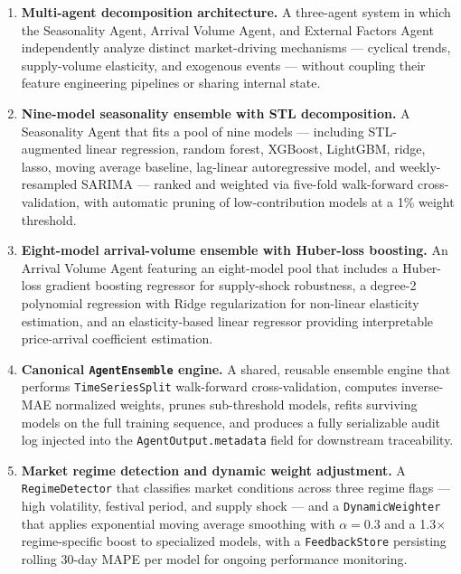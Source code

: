 \documentclass[12pt,a4paper]{report}
\begin{document}
\begin{enumerate}

    \item \textbf{Multi-agent decomposition architecture.} A three-agent system in which the Seasonality Agent, Arrival Volume Agent, and External Factors Agent independently analyze distinct market-driving mechanisms — cyclical trends, supply-volume elasticity, and exogenous events — without coupling their feature engineering pipelines or sharing internal state.

    \item \textbf{Nine-model seasonality ensemble with STL decomposition.} A Seasonality Agent that fits a pool of nine models — including STL-augmented linear regression, random forest, XGBoost, LightGBM, ridge, lasso, moving average baseline, lag-linear autoregressive model, and weekly-resampled SARIMA — ranked and weighted via five-fold walk-forward cross-validation, with automatic pruning of low-contribution models at a 1\% weight threshold.

    \item \textbf{Eight-model arrival-volume ensemble with Huber-loss boosting.} An Arrival Volume Agent featuring an eight-model pool that includes a Huber-loss gradient boosting regressor for supply-shock robustness, a degree-2 polynomial regression with Ridge regularization for non-linear elasticity estimation, and an elasticity-based linear regressor providing interpretable price-arrival coefficient estimation.

    \item \textbf{Canonical \texttt{AgentEnsemble} engine.} A shared, reusable ensemble engine that performs \texttt{TimeSeriesSplit} walk-forward cross-validation, computes inverse-MAE normalized weights, prunes sub-threshold models, refits surviving models on the full training sequence, and produces a fully serializable audit log injected into the \texttt{AgentOutput.metadata} field for downstream traceability.

    \item \textbf{Market regime detection and dynamic weight adjustment.} A \texttt{RegimeDetector} that classifies market conditions across three regime flags — high volatility, festival period, and supply shock — and a \texttt{DynamicWeighter} that applies exponential moving average smoothing with $\alpha=0.3$ and a 1.3$\times$ regime-specific boost to specialized models, with a \texttt{FeedbackStore} persisting rolling 30-day MAPE per model for ongoing performance monitoring.


\end{enumerate}
\end{document}
